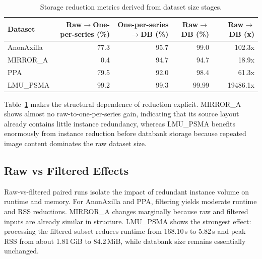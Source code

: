 \begin{table}[htbp]
\centering
\caption{Storage reduction metrics derived from dataset size stages.}
\label{tab:storage-reduction-metrics}
\small
\setlength{\tabcolsep}{5pt}
\begin{tabular}{@{}lrrrr@{}}
\toprule
Dataset & \makecell[c]{Raw$\rightarrow$One-per-series\\(\%)} & \makecell[c]{One-per-series$\rightarrow$DB\\(\%)} & \makecell[c]{Raw$\rightarrow$DB\\(\%)} & \makecell[c]{Raw$\rightarrow$DB\\(x)} \\
\midrule
AnonAxilla & 77.3 & 95.7 & 99.0  & 102.3x \\
MIRROR\_A  & 0.4  & 94.7 & 94.7  & 18.9x \\
PPA        & 79.5 & 92.0 & 98.4  & 61.3x \\
LMU\_PSMA  & 99.2 & 99.3 & 99.99 & 19486.1x \\
\bottomrule
\end{tabular}
\normalsize
\end{table}

Table~\ref{tab:storage-reduction-metrics} makes the structural dependence of reduction explicit. MIRROR\_A shows almost no raw-to-one-per-series gain, indicating that its source layout already contains little instance redundancy, whereas LMU\_PSMA benefits enormously from instance reduction before databank storage because repeated image content dominates the raw dataset size.


\subsection{Raw vs Filtered Effects}
Raw-vs-filtered paired runs isolate the impact of redundant instance volume on runtime and memory. For AnonAxilla and PPA, filtering yields moderate runtime and RSS reductions. MIRROR\_A changes marginally because raw and filtered inputs are already similar in structure. LMU\_PSMA shows the strongest effect: processing the filtered subset reduces runtime from 168.10\,s to 5.82\,s and peak RSS from about 1.81\,GiB to 84.2\,MiB, while databank size remains essentially unchanged.

